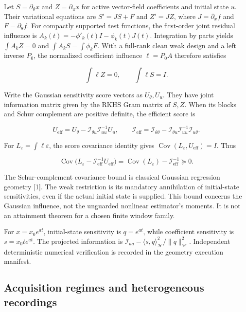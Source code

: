 \documentclass[
  11pt,
]{article}
\begin{document}
Let \(S=\partial_\theta x\) and \(Z=\partial_u x\) for active
vector-field coefficients and initial state \(u\). Their variational
equations are \(S'=JS+F\) and \(Z'=JZ\), where \(J=\partial_xf\) and
\(F=\partial_\theta f\). For compactly supported test functions, the
first-order joint residual influence is
\(A_k(t)=-\phi'_k(t)I-\phi_k(t)J(t)\). Integration by parts yields
\(\int A_kZ=0\) and \(\int A_kS=\int\phi_kF\). With a full-rank clean
weak design and a left inverse \(P_0\), the normalized coefficient
influence \(\ell=P_0A\) therefore satisfies

\[
\int\ell Z=0,\qquad\int\ell S=I.
\]

Write the Gaussian sensitivity score vectors as \(U_\theta,U_u\). They
have joint information matrix given by the RKHS Gram matrix of \(S,Z\).
When its blocks and Schur complement are positive definite, the
efficient score is

\[
U_{\mathrm{eff}}=U_\theta-\mathcal I_{\theta u}\mathcal I_{uu}^{-1}U_u,
\qquad
\mathcal I_{\mathrm{eff}}=\mathcal I_{\theta\theta}-\mathcal I_{\theta u}\mathcal I_{uu}^{-1}\mathcal I_{u\theta}.
\]

For \(L_\varepsilon=\int\ell\varepsilon\), the score covariance identity
gives \(\operatorname{Cov}(L_\varepsilon,U_{\mathrm{eff}})=I\). Thus

\[
\operatorname{Cov}\big(L_\varepsilon-\mathcal I_{\mathrm{eff}}^{-1}U_{\mathrm{eff}}\big)
=\operatorname{Cov}(L_\varepsilon)-\mathcal I_{\mathrm{eff}}^{-1}\succeq0.
\]

The Schur-complement covariance bound is classical Gaussian regression
geometry {[}1{]}. The weak restriction is its mandatory annihilation of
initial-state sensitivities, even if the actual initial state is
supplied. This bound concerns the Gaussian influence, not the unguarded
nonlinear estimator's moments. It is not an attainment theorem for a
chosen finite window family.

For \(x=x_0e^{at}\), initial-state sensitivity is \(q=e^{at}\), while
coefficient sensitivity is \(s=x_0te^{at}\). The projected information
is
\(\mathcal I_{aa}-\langle s,q\rangle_{\mathcal H}^2/\|q\|_{\mathcal H}^2\).
Independent deterministic numerical verification is recorded in the
geometry execution manifest.

\subsection{Acquisition regimes and heterogeneous
recordings}\label{acquisition-regimes-and-heterogeneous-recordings}
\end{document}
